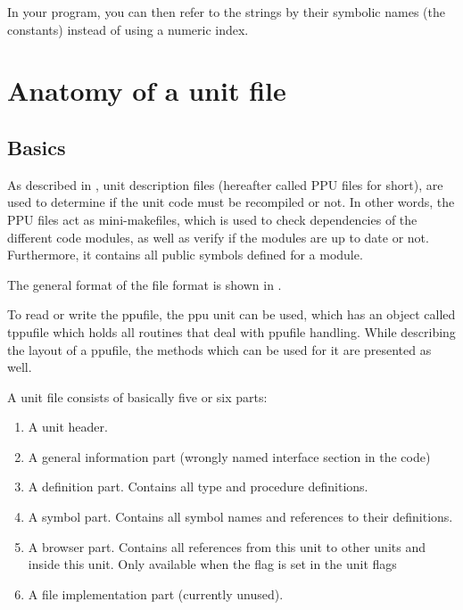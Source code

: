 In your program, you can then refer to the strings by their symbolic
names (the constants) instead of using a numeric index.

\appendix


\chapter{Anatomy of a unit file}
\label{ch:AppA}

\section{Basics}
As described in , unit description files (hereafter
called PPU files for short), are used to determine if the unit
code must be recompiled or not. In other words, the PPU files act
as mini-makefiles, which is used to check dependencies of the
different code modules, as well as verify if the modules are up
to date or not. Furthermore, it contains all public symbols defined
for a module.

The general format of the  file format is shown
in .


To read or write the ppufile, the ppu unit  can be used,
which has an object called tppufile which holds all routines that deal
with ppufile handling. While describing the layout of a ppufile, the
methods which can be used for it are presented as well.

A unit file consists of basically five or six parts:
\begin{enumerate}
\item A unit header.
\item A general information part (wrongly named interface section in the code)
\item A definition part. Contains all type and procedure definitions.
\item A symbol part. Contains all symbol names and references to their
definitions.
\item A browser part. Contains all references from this unit to other
units and inside this unit. Only available when the  flag is
set in the unit flags
\item A file implementation part (currently unused).
\end{enumerate}

